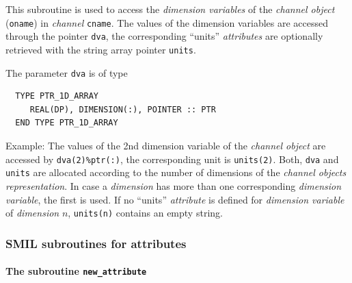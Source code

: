\documentclass[twoside]{article}
\begin{document}
This subroutine is used to access the {\it dimension variables} of
the {\it channel object} ({\tt oname}) in {\it channel} {\tt cname}.
The values of the dimension variables are accessed through the
pointer {\tt dva}, the corresponding ``units'' {\it attributes}
are optionally retrieved
with the string array pointer {\tt units}.

The parameter {\tt dva} is of type
\begin{verbatim}
  TYPE PTR_1D_ARRAY
     REAL(DP), DIMENSION(:), POINTER :: PTR
  END TYPE PTR_1D_ARRAY
\end{verbatim}
Example: The values of the 2nd dimension variable of the {\it channel object}
are accessed by {\tt dva(2)\%ptr(:)}, the corresponding unit is
{\tt units(2)}.
Both, {\tt dva} and  {\tt units} are allocated according to the
number of dimensions of the {\it channel objects} {\it representation}.
In case a {\it dimension} has more than one corresponding
{\it dimension variable}, the first is used. If no ``units''
{\it attribute} is defined for {\it dimension variable} of {\it dimension}
$n$, {\tt units(n)} contains an empty string.

\subsubsection{SMIL subroutines for attributes}

\paragraph{The subroutine {\tt new\_attribute}}\mbox{}\\
\end{document}
